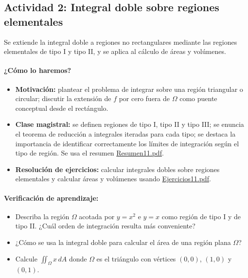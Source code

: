 \documentclass[a4,11pt]{aleph-notas}
\begin{document}
\subsection*{Actividad 2: Integral doble sobre regiones elementales}
Se extiende la integral doble a regiones no rectangulares mediante las regiones elementales de tipo I y tipo II, y se aplica al cálculo de áreas y volúmenes.

\paragraph{¿Cómo lo haremos?}
\begin{itemize}[leftmargin=*]
    \item \textbf{Motivación:} plantear el problema de integrar sobre una región triangular o circular; discutir la extensión de $f$ por cero fuera de $\Omega$ como puente conceptual desde el rectángulo.
    \item \textbf{Clase magistral:} se definen regiones de tipo I, tipo II y tipo III; se enuncia el teorema de reducción a integrales iteradas para cada tipo; se destaca la importancia de identificar correctamente los límites de integración según el tipo de región. Se usa el resumen \href{https://andres-merino.github.io/MatematicaIII-05-N0051/01Resumen/Resumen11.pdf}{Resumen11.pdf}.
    \item \textbf{Resolución de ejercicios:} calcular integrales dobles sobre regiones elementales y calcular áreas y volúmenes usando \href{https://andres-merino.github.io/MatematicaIII-05-N0051/04Ejercicios/Ejercicios11.pdf}{Ejercicios11.pdf}.
\end{itemize}

\paragraph{Verificación de aprendizaje:}
\begin{itemize}[leftmargin=*]
    \item Describa la región $\Omega$ acotada por $y=x^2$ e $y=x$ como región de tipo I y de tipo II. ¿Cuál orden de integración resulta más conveniente?
    \item ¿Cómo se usa la integral doble para calcular el área de una región plana $\Omega$?
    \item Calcule $\iint_\Omega x\,dA$ donde $\Omega$ es el triángulo con vértices $(0,0)$, $(1,0)$ y $(0,1)$.
\end{itemize}
\end{document}
